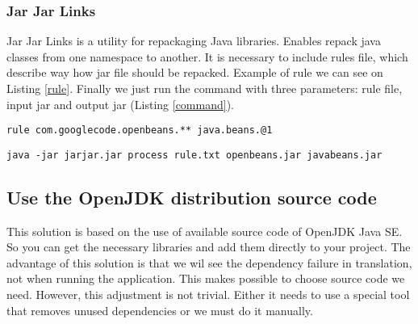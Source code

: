 \subsubsection{Jar Jar Links}
Jar Jar Links is a utility for repackaging Java libraries. Enables repack java classes from one namespace to another. It is necessary to include rules file, which describe way how jar file should be repacked. Example of rule we can see on Listing \ref{rule}. Finally we just run the command with three parameters: rule file, input jar and output jar (Listing \ref{command}). 
\\
\begin{lstlisting}[captionpos={b},caption={Jar Jar Links rule for repacking OpenBeans to java.beans namespace},frame={lines},label={rule},basicstyle=\footnotesize]
rule com.googlecode.openbeans.** java.beans.@1
\end{lstlisting}

\begin{lstlisting}[captionpos={b},caption={Command for repacking jar.},frame={lines},label={command},basicstyle=\footnotesize]
java -jar jarjar.jar process rule.txt openbeans.jar javabeans.jar
\end{lstlisting}

\subsection{Use the OpenJDK distribution source code}
This solution is based on the use of available source code of OpenJDK Java SE. So you can get the necessary libraries and add them directly to your project. The advantage of this solution is that we wil see the dependency failure in translation, not when running the application. This makes possible to choose source code we need. However, this adjustment is not trivial. Either it needs to use a special tool that removes unused dependencies or we must do it manually.

